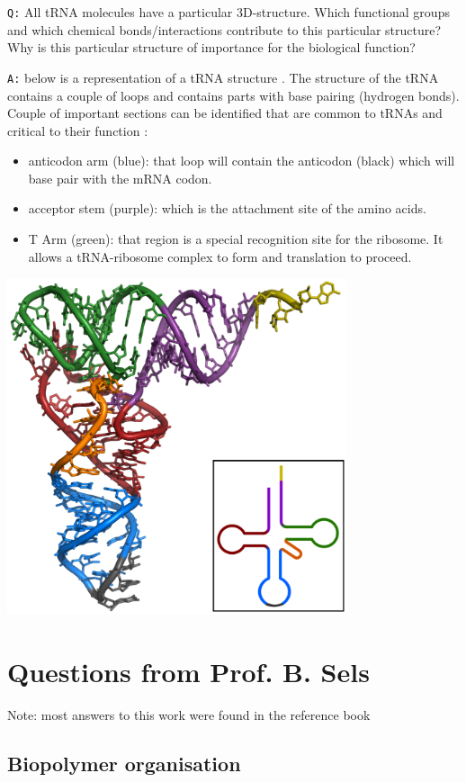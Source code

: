 \documentclass[11pt, a4paper,titlepage]{article}
\begin{document}
\texttt{Q:} All tRNA molecules have a particular 3D-structure. Which
functional groups and which chemical bonds/interactions contribute to
this particular structure? Why is this particular structure of
importance for the biological function?

\texttt{A:} below is a representation of a tRNA structure \cite{tRNA-Phe}. The
structure of the tRNA contains a couple of loops and contains parts
with base pairing (hydrogen bonds). Couple of important sections can
be identified that are common to tRNAs and critical to their
function :

\begin{itemize}
\item anticodon arm (blue): that loop will contain the anticodon (black)
  which will base pair with the mRNA codon.
\item acceptor stem (purple): which is the attachment site of the amino
  acids.
\item T Arm (green): that region is a special recognition site for the
  ribosome. It allows a tRNA-ribosome complex to form and translation
  to proceed.
\end{itemize}

\includegraphics[width=10cm]{./Figures/TRNA-Phe_yeast.png}
\section{Questions from Prof. B. Sels}
\label{sec-2}

Note: most answers to this work were found in the reference book \cite{BioChemBlei}
\subsection{Biopolymer organisation}
\label{sec-2-1}
\end{document}
